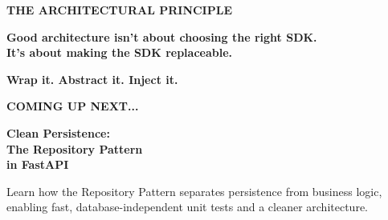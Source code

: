 \documentclass[11pt]{article}
\begin{document}
\vfill
\newpage


\vspace*{0.3in}
\begin{center}
    
    {\fontsize{14}{16}\selectfont\color{brandblue}\textbf{THE ARCHITECTURAL PRINCIPLE}}
    
    \vspace{0.8in}
    
    \begin{minipage}{0.85\textwidth}
        \centering
        {\fontsize{28}{36}\selectfont\color{brandnavy}\bfseries Good architecture isn't about choosing the right SDK.\\[0.3in] It's about making the SDK replaceable.}
    \end{minipage}
    
    \vspace{0.8in}
    
    {\fontsize{16}{20}\selectfont\color{brandgray}\textbf{Wrap it. \quad Abstract it. \quad Inject it.}}
    
\end{center}
\vfill
\newpage

\thispagestyle{empty}
\vspace*{0.5in} 
\begin{center}
    {\fontsize{14}{16}\selectfont\color{brandblue}\textbf{COMING UP NEXT...}}
    
    \vspace{0.4in} 
    
    {\fontsize{32}{38}\selectfont\color{brandnavy}\bfseries Clean Persistence:\\The Repository Pattern\\in FastAPI}
    
    \vspace{0.4in} 
    
    \begin{minipage}{0.7\textwidth}
        \centering
        \color{brandgray}\fontsize{14}{18}\selectfont
        Learn how the Repository Pattern separates persistence from business logic, enabling fast, database-independent unit tests and a cleaner architecture.
    \end{minipage}
\end{center}
\end{document}
